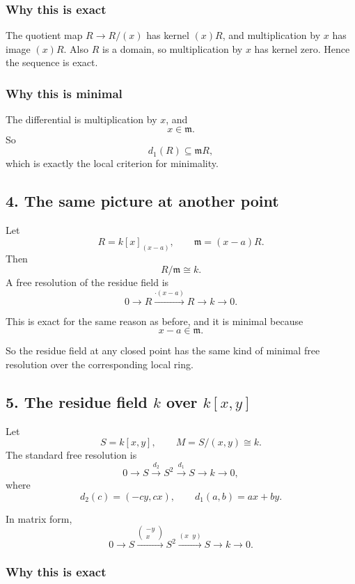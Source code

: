 \documentclass[12pt,a4paper]{article}
\theoremstyle{notespace}
\theoremstyle{definition}
\begin{document}
\subsubsection*{Why this is exact}

The quotient map \(R\to R/(x)\) has kernel \((x)R\), and multiplication by \(x\) has image \((x)R\).
Also \(R\) is a domain, so multiplication by \(x\) has kernel zero.
Hence the sequence is exact.

\subsubsection*{Why this is minimal}

The differential is multiplication by \(x\), and
\[
x\in \mathfrak m.
\]
So
\[
d_1(R)\subseteq \mathfrak m R,
\]
which is exactly the local criterion for minimality.

\subsection{4. The same picture at another point}

Let
\[
R=k[x]_{(x-a)},
\qquad
\mathfrak m=(x-a)R.
\]
Then
\[
R/\mathfrak m \cong k.
\]
A free resolution of the residue field is
\[
0 \longrightarrow R \xrightarrow{\cdot (x-a)} R \longrightarrow k \longrightarrow 0.
\]

This is exact for the same reason as before, and it is minimal because
\[
x-a \in \mathfrak m.
\]

So the residue field at any closed point has the same kind of minimal free resolution over the corresponding local ring.

\subsection{5. The residue field \(k\) over \(k[x,y]\)}

Let
\[
S=k[x,y], \qquad M=S/(x,y)\cong k.
\]
The standard free resolution is
\[
0 \longrightarrow S \xrightarrow{d_2} S^2 \xrightarrow{d_1} S \longrightarrow k \longrightarrow 0,
\]
where
\[
d_2(c)=(-cy,cx),
\qquad
d_1(a,b)=ax+by.
\]

In matrix form,
\[
0 \longrightarrow S \xrightarrow{\begin{pmatrix}-y\\x\end{pmatrix}} S^2
\xrightarrow{(x\;\;y)} S \longrightarrow k \longrightarrow 0.
\]

\subsubsection*{Why this is exact}
\end{document}
